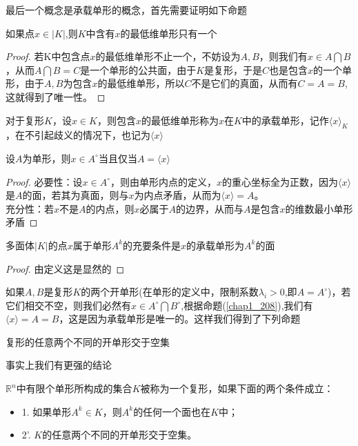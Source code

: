 最后一个概念是承载单形的概念，首先需要证明如下命题
\begin{proposition}
如果点$x\in |K|$,则$K$中含有$x$的最低维单形只有一个
\end{proposition}
\begin{proof}
若K中包含点$x$的最低维单形不止一个，不妨设为$A,B$，则我们有$x\in A\bigcap B$，从而$A\bigcap B=C$是一个单形的公共面，由于$K$是复形，于是$C$也是包含$x$的一个单形，由于$A,B$为包含$x$的最低维单形，所以$C$不是它们的真面，从而有$C=A=B$,这就得到了唯一性。
\end{proof}
\begin{definition}[承载单形]
对于复形$K$，设$x\in K$，则包含$x$的最低维单形称为$x$在$K$中的承载单形，记作$\langle x\rangle_{K}$，在不引起歧义的情况下，也记为$\langle x\rangle$
\end{definition}
\begin{proposition}
\label{chap1_208}
设$A$为单形，则$x\in A^{\circ}$当且仅当$A=\langle x\rangle$
\end{proposition}
\begin{proof}
必要性：设$x\in A^{\circ}$，则由单形内点的定义，$x$的重心坐标全为正数，因为$\langle x\rangle$是$A$的面，若其为真面，则与$x$为内点矛盾，从而为$\langle x\rangle=A$。\\
充分性：若$x$不是$A$的内点，则$x$必属于$A$的边界，从而与$A$是包含$x$的维数最小单形矛盾
\end{proof}
\begin{proposition}\label{pro261}
多面体$|K|$的点$x$属于单形$A^{k}$的充要条件是$x$的承载单形为$A^{k}$的面
\end{proposition}
\begin{proof}
由定义这是显然的
\end{proof}
如果$A,B$是复形$K$的两个开单形(在单形的定义中，限制系数$\lambda_{i}>0$,即$A=A^{\circ}$)，若它们相交不空，则我们必然有$x\in A^{\circ}\bigcap B^{\circ}$,根据命题(\ref{chap1_208}),我们有$\langle x\rangle=A=B$，这是因为承载单形是唯一的。这样我们得到了下列命题
\begin{proposition}
复形的任意两个不同的开单形交于空集
\end{proposition}
事实上我们有更强的结论
\begin{proposition}\label{pro272}
$\mathbb{R}^{n}$中有限个单形所构成的集合$K$被称为一个复形，如果下面的两个条件成立：
\begin{itemize}
    \item 1. 如果单形$A^{k}\in K$，则$A^{k}$的任何一个面也在$K$中；
    \item 2'. $K$的任意两个不同的开单形交于空集。
\end{itemize}
\end{proposition}

